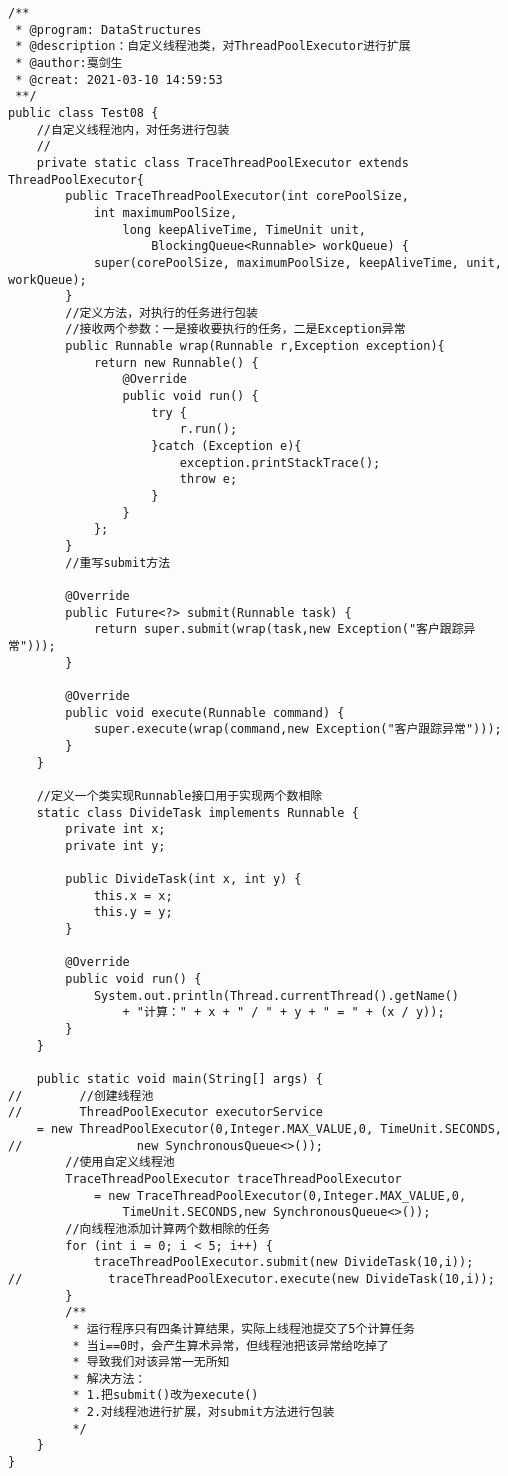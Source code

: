 \documentclass[a4paper]{report}
\begin{document}
\begin{Verbatim}[frame=single,numbersep=5pt,xleftmargin=1.5em,xrightmargin=1.5em]
/**
 * @program: DataStructures
 * @description：自定义线程池类，对ThreadPoolExecutor进行扩展
 * @author:戛剑生
 * @creat: 2021-03-10 14:59:53
 **/
public class Test08 {
    //自定义线程池内，对任务进行包装
    //
    private static class TraceThreadPoolExecutor extends ThreadPoolExecutor{
        public TraceThreadPoolExecutor(int corePoolSize,
            int maximumPoolSize,
                long keepAliveTime, TimeUnit unit,
                    BlockingQueue<Runnable> workQueue) {
            super(corePoolSize, maximumPoolSize, keepAliveTime, unit, workQueue);
        }
        //定义方法，对执行的任务进行包装
        //接收两个参数：一是接收要执行的任务，二是Exception异常
        public Runnable wrap(Runnable r,Exception exception){
            return new Runnable() {
                @Override
                public void run() {
                    try {
                        r.run();
                    }catch (Exception e){
                        exception.printStackTrace();
                        throw e;
                    }
                }
            };
        }
        //重写submit方法

        @Override
        public Future<?> submit(Runnable task) {
            return super.submit(wrap(task,new Exception("客户跟踪异常")));
        }

        @Override
        public void execute(Runnable command) {
            super.execute(wrap(command,new Exception("客户跟踪异常")));
        }
    }

    //定义一个类实现Runnable接口用于实现两个数相除
    static class DivideTask implements Runnable {
        private int x;
        private int y;

        public DivideTask(int x, int y) {
            this.x = x;
            this.y = y;
        }

        @Override
        public void run() {
            System.out.println(Thread.currentThread().getName()
                + "计算：" + x + " / " + y + " = " + (x / y));
        }
    }

    public static void main(String[] args) {
//        //创建线程池
//        ThreadPoolExecutor executorService
    = new ThreadPoolExecutor(0,Integer.MAX_VALUE,0, TimeUnit.SECONDS,
//                new SynchronousQueue<>());
        //使用自定义线程池
        TraceThreadPoolExecutor traceThreadPoolExecutor
            = new TraceThreadPoolExecutor(0,Integer.MAX_VALUE,0,
                TimeUnit.SECONDS,new SynchronousQueue<>());
        //向线程池添加计算两个数相除的任务
        for (int i = 0; i < 5; i++) {
            traceThreadPoolExecutor.submit(new DivideTask(10,i));
//            traceThreadPoolExecutor.execute(new DivideTask(10,i));
        }
        /**
         * 运行程序只有四条计算结果，实际上线程池提交了5个计算任务
         * 当i==0时，会产生算术异常，但线程池把该异常给吃掉了
         * 导致我们对该异常一无所知
         * 解决方法：
         * 1.把submit()改为execute()
         * 2.对线程池进行扩展，对submit方法进行包装
         */
    }
}\end{Verbatim}
\end{document}
